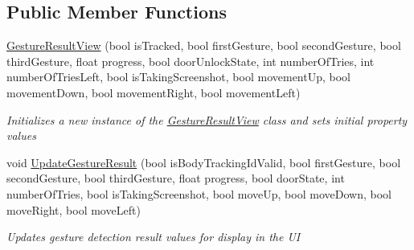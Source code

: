 \subsection*{Public Member Functions}
\begin{DoxyCompactItemize}
\item 
\hyperlink{class_microsoft_1_1_samples_1_1_kinect_1_1_kinect_security_system_1_1_gesture_result_view_a577bb3cc591276f7128384ca55746126}{Gesture\+Result\+View} (bool is\+Tracked, bool first\+Gesture, bool second\+Gesture, bool third\+Gesture, float progress, bool door\+Unlock\+State, int number\+Of\+Tries, int number\+Of\+Tries\+Left, bool is\+Taking\+Screenshot, bool movement\+Up, bool movement\+Down, bool movement\+Right, bool movement\+Left)
\begin{DoxyCompactList}\small\item\em Initializes a new instance of the \hyperlink{class_microsoft_1_1_samples_1_1_kinect_1_1_kinect_security_system_1_1_gesture_result_view}{Gesture\+Result\+View} class and sets initial property values \end{DoxyCompactList}\item 
void \hyperlink{class_microsoft_1_1_samples_1_1_kinect_1_1_kinect_security_system_1_1_gesture_result_view_a185ed5540a78c5d1b9044148936496b6}{Update\+Gesture\+Result} (bool is\+Body\+Tracking\+Id\+Valid, bool first\+Gesture, bool second\+Gesture, bool third\+Gesture, float progress, bool door\+State, int number\+Of\+Tries, bool is\+Taking\+Screenshot, bool move\+Up, bool move\+Down, bool move\+Right, bool move\+Left)
\begin{DoxyCompactList}\small\item\em Updates gesture detection result values for display in the UI \end{DoxyCompactList}\end{DoxyCompactItemize}
